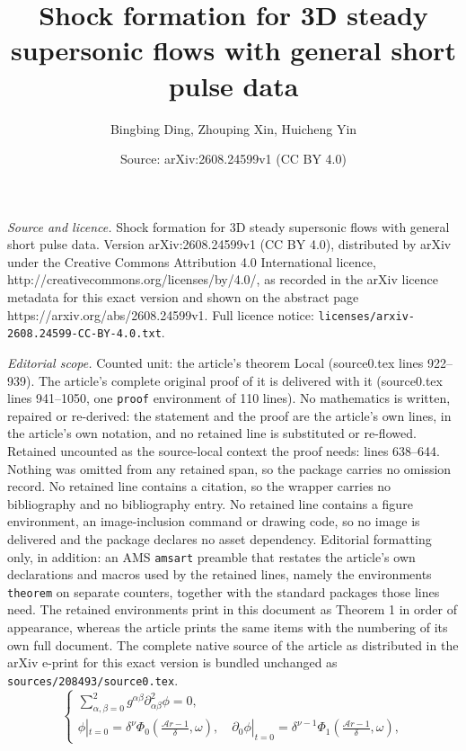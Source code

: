 \documentclass[10pt,a4paper]{amsart}
\title{Shock formation for 3D steady supersonic flows with general short pulse data}
\author{Bingbing Ding, Zhouping Xin, Huicheng Yin}
\date{Source: arXiv:2608.24599v1 (CC BY 4.0)}
\begin{document}
\maketitle

\noindent\emph{Source and licence.} Shock formation for 3D steady supersonic flows with general short pulse data. Version arXiv:2608.24599v1 (CC BY 4.0), distributed by arXiv under the Creative Commons Attribution 4.0 International licence, http://creativecommons.org/licenses/by/4.0/, as recorded in the arXiv licence metadata for this exact version and shown on the abstract page https://arxiv.org/abs/2608.24599v1. Full licence notice: \texttt{licenses/arxiv-2608.24599-CC-BY-4.0.txt}.\par\smallskip

\noindent\textit{Editorial scope.} Counted unit: the article's theorem Local (source0.tex lines 922--939). The article's complete original proof of it is delivered with it (source0.tex lines 941--1050, one \texttt{proof} environment of 110 lines). No mathematics is written, repaired or re-derived: the statement and the proof are the article's own lines, in the article's own notation, and no retained line is substituted or re-flowed.  Retained uncounted as the source-local context the proof needs: lines 638--644.  Nothing was omitted from any retained span, so the package carries no omission record.  No retained line contains a citation, so the wrapper carries no bibliography and no bibliography entry.  No retained line contains a figure environment, an image-inclusion command or drawing code, so no image is delivered and the package declares no asset dependency.  Editorial formatting only, in addition: an AMS \texttt{amsart} preamble that restates the article's own declarations and macros used by the retained lines, namely the environments \texttt{theorem} on separate counters, together with the standard packages those lines need.  The retained environments print in this document as Theorem 1 in order of appearance, whereas the article prints the same items with the numbering of its own full document.  The complete native source of the article as distributed in the arXiv e-print for this exact version is bundled unchanged as \texttt{sources/208493/source0.tex}.
\begin{equation}\label{mainequation}
\begin{cases}
\displaystyle\sum_{\alpha,\beta=0}^2 g^{\alpha\beta} \partial_{\alpha\beta}^2 \phi = 0,\\[6pt]
\phi|_{t=0}=\delta^{\nu}\Phi_0(\frac{\mathcal{A}r - 1}{\delta}, \omega), \quad
\partial_{0}\phi|_{t=0}=\delta^{\nu - 1}\Phi_1(\frac{\mathcal{A}r - 1}{\delta}, \omega),
\end{cases}
\end{equation}
\end{document}
